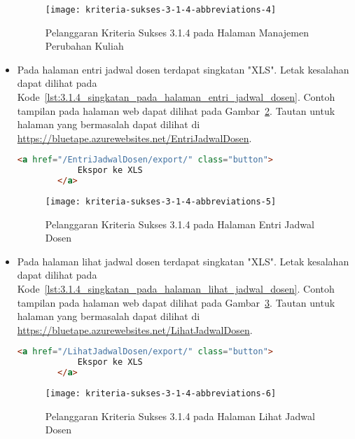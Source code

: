 \begin{itemize}
    \begin{figure}[H]
        \centering  
        \texttt{[image: kriteria-sukses-3-1-4-abbreviations-4]}  
        \caption[Pelanggaran Kriteria Sukses 3.1.4 pada Halaman Manajemen Perubahan Kuliah]{Pelanggaran Kriteria Sukses 3.1.4 pada Halaman Manajemen Perubahan Kuliah}
        \label{fig:3.1.4_abbreviations_4}  
    \end{figure}
    
    \item Pada halaman entri jadwal dosen terdapat singkatan "XLS". Letak kesalahan dapat dilihat pada \mbox{Kode \ref{lst:3.1.4_singkatan_pada_halaman_entri_jadwal_dosen}}. Contoh tampilan pada halaman web dapat dilihat pada \mbox{Gambar \ref{fig:3.1.4_abbreviations_5}}. Tautan untuk halaman yang bermasalah dapat dilihat di \url{https://bluetape.azurewebsites.net/EntriJadwalDosen}.
    \begin{lstlisting}[frame=single, label={lst:3.1.4_singkatan_pada_halaman_entri_jadwal_dosen}, language=HTML, caption=Pelanggaran Kriteria Sukses 3.1.4 pada Halaman Entri Jadwal Dosen]
        <a href="/EntriJadwalDosen/export/" class="button">
            Ekspor ke XLS
        </a>
    \end{lstlisting}

    \begin{figure}[H]
        \centering  
        \texttt{[image: kriteria-sukses-3-1-4-abbreviations-5]}  
        \caption[Pelanggaran Kriteria Sukses 3.1.4 pada Halaman Entri Jadwal Dosen]{Pelanggaran Kriteria Sukses 3.1.4 pada Halaman Entri Jadwal Dosen}
        \label{fig:3.1.4_abbreviations_5}  
    \end{figure}
    
    \item Pada halaman lihat jadwal dosen terdapat singkatan "XLS". Letak kesalahan dapat dilihat pada \mbox{Kode \ref{lst:3.1.4_singkatan_pada_halaman_lihat_jadwal_dosen}}. Contoh tampilan pada halaman web dapat dilihat pada \mbox{Gambar \ref{fig:3.1.4_abbreviations_6}}. Tautan untuk halaman yang bermasalah dapat dilihat di \url{https://bluetape.azurewebsites.net/LihatJadwalDosen}.

    \begin{lstlisting}[frame=single, label={lst:3.1.4_singkatan_pada_halaman_lihat_jadwal_dosen}, language=HTML, caption=Pelanggaran Kriteria Sukses 3.1.4 pada Halaman Lihat Jadwal Dosen]
        <a href="/LihatJadwalDosen/export/" class="button">
            Ekspor ke XLS
        </a>
    \end{lstlisting}

    \begin{figure}[H]
        \centering  
        \texttt{[image: kriteria-sukses-3-1-4-abbreviations-6]}  
        \caption[Pelanggaran Kriteria Sukses 3.1.4 pada Halaman Lihat Jadwal Dosen]{Pelanggaran Kriteria Sukses 3.1.4 pada Halaman Lihat Jadwal Dosen}
        \label{fig:3.1.4_abbreviations_6}  
    \end{figure}
\end{itemize}

